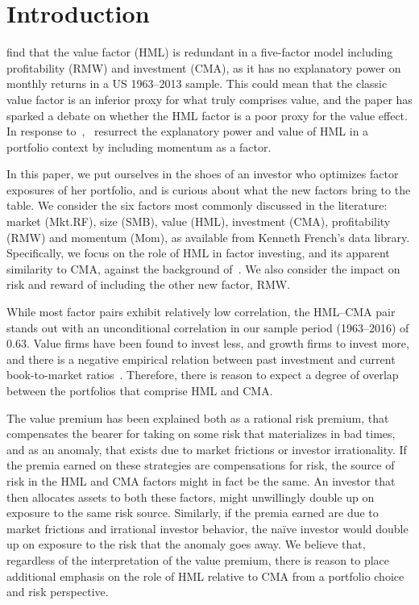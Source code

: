 \section{Introduction}
\textcite{FF2015} find that the value factor (HML) is redundant in a five-factor model including profitability (RMW) and investment (CMA), as it has no explanatory power on monthly returns in a US 1963–2013 sample. This could mean that the classic value factor is an inferior proxy for what truly comprises value, and the paper has sparked a debate on whether the HML factor is a poor proxy for the value effect. In response to~\textcite{FF2015},~\textcite{Asness2015} resurrect the explanatory power and value of HML in a portfolio context by including momentum as a factor.

In this paper, we put ourselves in the shoes of an investor who optimizes factor exposures of her portfolio, and is curious about what the new factors bring to the table. We consider the six factors most commonly discussed in the literature: market (Mkt.RF), size (SMB), value (HML), investment (CMA), profitability (RMW) and momentum (Mom), as available from Kenneth French's data library. Specifically, we focus on the role of HML in factor investing, and its apparent similarity to CMA, against the background of~\textcite{FF2015,Asness2015}. We also consider the impact on risk and reward of including the other new factor, RMW.

While most factor pairs exhibit relatively low correlation, the HML--CMA pair stands out with an unconditional correlation in our sample period (1963--2016) of 0.63. Value firms have been found to invest less, and growth firms to invest more, and there is a negative empirical relation between past investment and current book-to-market ratios~\autocite{Zhang2005,AndersonGarciaFeijoo2006}. Therefore, there is reason to expect a degree of overlap between the portfolios that comprise HML and CMA.

The value premium has been explained both as a rational risk premium, that compensates the bearer for taking on some risk that materializes in bad times, and as an anomaly, that exists due to market frictions or investor irrationality. If the premia earned on these strategies are compensations for risk, the source of risk in the HML and CMA factors might in fact be the same. An investor that then allocates assets to both these factors, might unwillingly double up on exposure to the same risk source. Similarly, if the premia earned are due to market frictions and irrational investor behavior, the naïve investor would double up on exposure to the risk that the anomaly goes away. We believe that, regardless of the interpretation of the value premium, there is reason to place additional emphasis on the role of HML relative to CMA from a portfolio choice and risk perspective.

